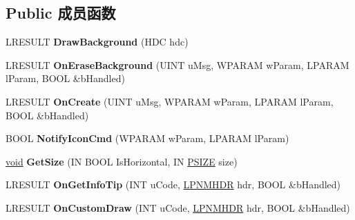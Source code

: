 \subsection*{Public 成员函数}
\begin{DoxyCompactItemize}
\item 
\mbox{\label{class_c_sys_pager_wnd_ac205ae1921d50600b48754f69efb2f3c}} 
L\+R\+E\+S\+U\+LT {\bfseries Draw\+Background} (H\+DC hdc)
\item 
\mbox{\label{class_c_sys_pager_wnd_ad7fd738390a05519acdc43318777b9b0}} 
L\+R\+E\+S\+U\+LT {\bfseries On\+Erase\+Background} (U\+I\+NT u\+Msg, W\+P\+A\+R\+AM w\+Param, L\+P\+A\+R\+AM l\+Param, B\+O\+OL \&b\+Handled)
\item 
\mbox{\label{class_c_sys_pager_wnd_a90d83a27b1731a1d33beaf69e3a6c3a4}} 
L\+R\+E\+S\+U\+LT {\bfseries On\+Create} (U\+I\+NT u\+Msg, W\+P\+A\+R\+AM w\+Param, L\+P\+A\+R\+AM l\+Param, B\+O\+OL \&b\+Handled)
\item 
\mbox{\label{class_c_sys_pager_wnd_a8582b7132426dba0116ec70b43b14754}} 
B\+O\+OL {\bfseries Notify\+Icon\+Cmd} (W\+P\+A\+R\+AM w\+Param, L\+P\+A\+R\+AM l\+Param)
\item 
\mbox{\label{class_c_sys_pager_wnd_a1f4183ae65a257e2b6010095bbdbc806}} 
\hyperlink{interfacevoid}{void} {\bfseries Get\+Size} (IN B\+O\+OL Is\+Horizontal, IN \hyperlink{structtag_s_i_z_e}{P\+S\+I\+ZE} size)
\item 
\mbox{\label{class_c_sys_pager_wnd_ae969d62cce89337b9bdc44ec84d8b7ac}} 
L\+R\+E\+S\+U\+LT {\bfseries On\+Get\+Info\+Tip} (I\+NT u\+Code, \hyperlink{structtag_n_m_h_d_r}{L\+P\+N\+M\+H\+DR} hdr, B\+O\+OL \&b\+Handled)
\item 
\mbox{\label{class_c_sys_pager_wnd_a6790aaa22d90fec542866f89633ce037}} 
L\+R\+E\+S\+U\+LT {\bfseries On\+Custom\+Draw} (I\+NT u\+Code, \hyperlink{structtag_n_m_h_d_r}{L\+P\+N\+M\+H\+DR} hdr, B\+O\+OL \&b\+Handled)
\item 
\mbox{\label{class_c_sys_pager_wnd_ab2f873e6696260c4dff2d4028a589242}} 

\end{DoxyCompactItemize}
